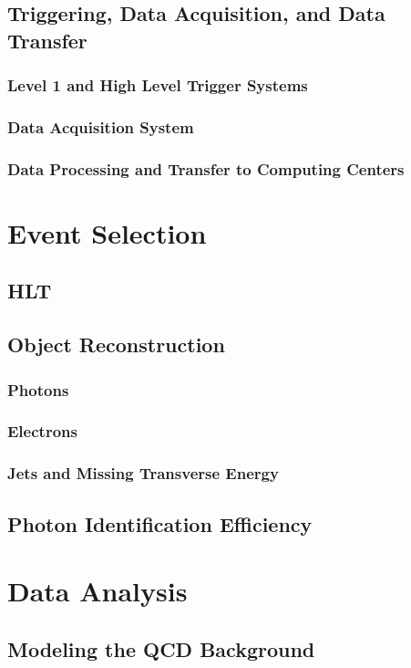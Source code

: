 \documentclass[12pt, letterpaper]{report}
\begin{document}
\section{Triggering, Data Acquisition, and Data Transfer}
\subsection{Level 1 and High Level Trigger Systems}
\subsection{Data Acquisition System}
\subsection{Data Processing and Transfer to Computing Centers}

\chapter{Event Selection}
\section{HLT}
\section{Object Reconstruction}
\subsection{Photons}
\subsection{Electrons}
\subsection{Jets and Missing Transverse Energy}
\section{Photon Identification Efficiency}

\chapter{Data Analysis}
\section{Modeling the QCD Background}
\end{document}
